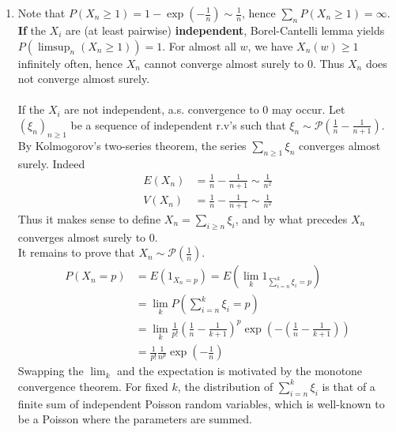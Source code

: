 \documentclass[a4paper,11pt]{article}
\begin{document}
\begin{enumerate}
\begin{enumerate}
    \item Note that $P(X_n\geq 1) = 1-\exp(-\frac 1n)\sim \frac 1n$, hence $\sum_n P(X_n\geq 1) = \infty$.\\
    \textbf{If} the $X_i$ are (at least pairwise) \textbf{independent}, Borel-Cantelli lemma yields \\
    $P\left(\limsup_n \left(X_n\geq 1\right)\right)=1$. For almost all $w$, we have $X_n(w)\geq 1$ infinitely often, hence $X_n$ cannot converge almost surely to $0$. Thus $X_n$ does not converge almost surely.\\\\
    If the $X_i$ are not independent, a.s. convergence to $0$ may occur. Let $(\xi_n)_{n\geq 1}$ be a sequence of independent r.v's such that $\xi_n \sim \mathcal P(\frac{1}{n}-\frac{1}{n+1})$. By Kolmogorov's two-series theorem, the series $\sum_{n\geq 1} \xi_n$ converges almost surely. Indeed 
    $$\begin{aligned}
    E(X_n) &= \frac{1}{n}-\frac{1}{n+1} \sim \frac{1}{n^2}\\
    V(X_n) &= \frac{1}{n}-\frac{1}{n+1} \sim \frac{1}{n^2}
    \end{aligned}
    $$
    Thus it makes sense to define $X_n=\sum_{i\geq n} \xi_i$, and by what precedes $X_n$ converges almost surely to $0$.\\
    It remains to prove that $X_n\sim \mathcal P(\frac 1n)$. 
    $$\begin{aligned}P(X_n=p) &= E(1_{X_n=p}) =  E(\lim_k1_{\sum_{i=n}^k\xi_i=p})\\
&= \lim_k P(\sum_{i=n}^k\xi_i=p)\\
&= \lim_k \frac{1}{p!}\left(\frac 1n - \frac 1{k+1}\right)^p \exp\left(-(\frac 1n - \frac 1{k+1})\right) \\
&= \frac{1}{p!}\frac 1{n^p} \exp(-\frac 1n)
\end{aligned}$$
    Swapping the $\lim_k$ and the expectation is motivated by the monotone convergence theorem. For fixed $k$, the distribution of $\sum_{i=n}^k\xi_i$ is that of a finite sum of independent Poisson random variables, which is well-known to be a Poisson where the parameters are summed.
    \end{enumerate}
  
\end{enumerate}
\end{document}
